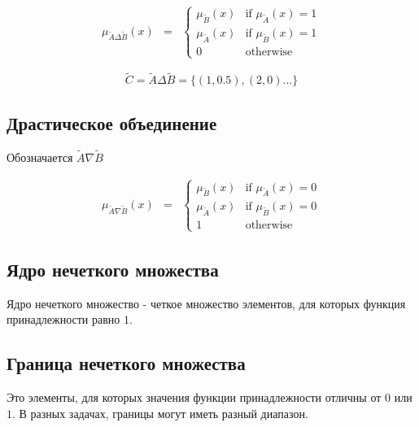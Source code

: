 			\begin{equation}
                \begin{matrix}
                \mu_{\tilde A \Delta \tilde B}(x) & =
                & \left\{
                \begin{matrix}
                \mu_{\tilde B}(x) & \mbox{if } \mu_{\tilde A }(x) = 1\\
                \mu_{\tilde A}(x) & \mbox{if } \mu_{\tilde B }(x) = 1\\
                0 & \mbox{otherwise }
                \end{matrix} \right.
                \end{matrix}
            \end{equation}
			
			\[\tilde C = \tilde A \Delta \tilde B = \{(1, 0.5), (2, 0) ...\}\]
		
		\subsection{Драстическое объединение}
		    Обозначается $\tilde A \nabla \tilde B$
		
			\begin{equation}
                \begin{matrix}
                \mu_{\tilde A \nabla \tilde B}(x) & =
                & \left\{
                \begin{matrix}
                \mu_{\tilde B}(x) & \mbox{if } \mu_{\tilde A }(x) = 0\\
                \mu_{\tilde A}(x) & \mbox{if } \mu_{\tilde B }(x) = 0\\
                1 & \mbox{otherwise }
                \end{matrix} \right.
                \end{matrix}
            \end{equation}
			
		\subsection{Ядро нечеткого множества}
			Ядро нечеткого множество - четкое множество элементов, для которых функция принадлежности
			равно $1$.
			
		\subsection{Граница нечеткого множества}
			Это элементы, для которых значения функции принадлежности отличны от $0$ или $1$. В разных
			задачах, границы могут иметь разный диапазон.
			
